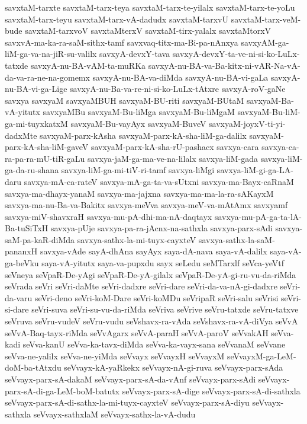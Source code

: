 {savxtaM-tarxte
savxtaM-tarx-teya
savxtaM-tarx-te-yilalx
savxtaM-tarx-te-yoLu
savxtaM-tarx-teyu
savxtaM-tarx-vA-dadudx
savxtaM-tarxvU
savxtaM-tarx-veM-bude
savxtaM-tarxvoV
savxtaMterxV
savxtaM-tirx-yalalx
savxtaMtorxV
savxvA-ma-ka-ra-saM-sithx-tamf
savxvaq-titx-ma-Bi-pa-nAnxya
savxyAM-ga-liM-ga-va-na-jiR-su-valilx
savxyA-devxY-tava
savxyA-devxY-ta-ve-ni-si-ko-LuLx-tatxde
savxyA-nu-BA-vAM-ta-muRKa
savxyA-nu-BA-va-Ba-kitx-ni-vAR-Na-vA-da-va-ra-ne-na-gomemx
savxyA-nu-BA-va-diMda
savxyA-nu-BA-vi-gaLa
savxyA-nu-BA-vi-ga-Lige
savxyA-nu-Ba-va-re-ni-si-ko-LuLx-tAtxre
savxyA-roV-gaNe
savxya
savxyaM
savxyaMBUH
savxyaM-BU-riti
savxyaM-BUtaM
savxyaM-Ba-vA-yitutx
savxyaMBu
savxyaM-Bu-liMga
savxyaM-Bu-liMgaM
savxyaM-Bu-liM-ga-mi-tuyxkatxM
savxyaM-Bu-vayAyx
savxyaM-BuveV
savxyaM-joyxV-ti-yi-dadxMte
savxyaM-parx-kAsha
savxyaM-parx-kA-sha-liM-ga-dalilx
savxyaM-parx-kA-sha-liM-gaveV
savxyaM-parx-kA-sha-rU-pashacx
savxya-cara
savxya-ca-ra-pa-ra-mU-tiR-gaLu
savxya-jaM-ga-ma-ve-na-lilalx
savxya-liM-gada
savxya-liM-ga-da-ru-shana
savxya-liM-ga-mi-tiV-ri-tamf
savxya-liMgi
savxya-liM-gi-ga-LA-daru
savxya-mA-ca-rateV
savxya-mA-ga-ta-va-sUtxni
savxya-ma-Bayx-caRnaM
savxya-ma-dhayx-yanaM
savxya-ma-jajxna
savxya-ma-ma-la-ra-sAKayxM
savxya-ma-nu-Ba-va-Bakitx
savxya-meVva
savxya-meV-va-mAtAmx
savxyamf
savxya-miV-shavxraH
savxya-mu-pA-dhi-ma-nA-daqtayx
savxya-mu-pA-ga-ta-lA-Ba-tuSiTxH
savxya-pUje
savxya-pa-ra-jAcnx-na-sathxla
savxya-parx-sAdi
savxya-saM-pa-kaR-diMda
savxya-sathx-la-mi-tuyx-cayxteV
savxya-sathx-la-saM-pananxH
savxya-vAde
sayA-dhAna
sayAyx
saya-dA-nava
saya-vA-dalilx
saya-vA-ga-beVku
saya-vA-yitutx
saya-va-pupxdu
sayx
seLedu
seMTarxlf
seVca-yeVtf
seVneya
seVpaR-De-yAgi
seVpaR-De-yA-gilalx
seVpaR-De-yA-gi-ru-vu-da-riMda
seVrada
seVri
seVri-daMte
seVri-dadxre
seVri-dare
seVri-da-va-nA-gi-dadxre
seVri-da-varu
seVri-deno
seVri-koM-Dare
seVri-koMDu
seVripaR
seVri-salu
seVrisi
seVri-si-dare
seVri-suva
seVri-su-vu-da-riMda
seVriva
seVrive
seVru-tatxde
seVru-tatxve
seVruva
seVru-vudeV
seVru-vudu
seVshavx-ra-vAda
seVshavx-ra-vA-diVya
seVvA
seVvA-Baq-tayx-riMda
seVvAgarx
seVvA-paraH
seVvA-paroV
seVvakAH
seVva-kadi
seVva-kanU
seVva-ka-tavx-diMda
seVva-ka-vayx-sana
seVvanaM
seVvane
seVva-ne-yalilx
seVva-ne-yiMda
seVvayx
seVvayxH
seVvayxM
seVvayxM-ga-LeM-doM-ba-tAtxdu
seVvayx-kA-yaRkekx
seVvayx-nA-gi-ruva
seVvayx-parx-sAda
seVvayx-parx-sA-dakaM
seVvayx-parx-sA-da-vAnf
seVvayx-parx-sAdi
seVvayx-parx-sA-di-ga-LeM-boM-batutx
seVvayx-parx-sA-dige
seVvayx-parx-sA-di-sathxla
seVvayx-parx-sA-di-sathx-la-mi-tuyx-cayxteV
seVvayx-parx-sA-diyu
seVvayx-sathxla
seVvayx-sathxlaM
seVvayx-sathx-la-vA-dudu
}
